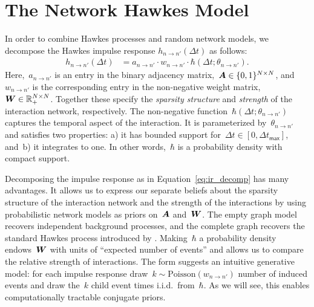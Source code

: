 \section{The Network Hawkes Model}
\label{sec:network_hawkes_model}
In order to combine Hawkes processes and random network models, we
decompose the Hawkes impulse response $h_{n \to n'}(\Delta t)$ as
follows:
\begin{align}
\label{eq:ir_decomp}
h_{n \to n'}(\Delta t) &= a_{n \to n'} \cdot w_{n \to n'} \cdot \hbar(\Delta t; \theta_{n \to n'}).
\end{align}
Here,~$a_{n \to n'}$ is an entry in the binary adjacency
matrix,~${\boldsymbol{A}\in\{0,1\}^{N \times N}}$,
and~$w_{n \to n'}$ is the corresponding entry in the non-negative
weight matrix,~${\boldsymbol{W} \in\mathbb{R}_+^{N\times N}}$. Together these specify
the \emph{sparsity structure} and \emph{strength} of the interaction
network, respectively. The non-negative function~${\hbar(\Delta t;
  \theta_{n \to n'})}$ captures the temporal aspect of the
interaction. It is parameterized by~${\theta_{n \to n'}}$ and
satisfies two properties: a) it has bounded support for~${\Delta t \in
  [0,\Delta t_{\mathsf{max}}]}$, and~b) it integrates to one. In other
words,~$\hbar$ is a probability density with compact support.

Decomposing the impulse response as in Equation~\ref{eq:ir_decomp} has
many advantages. It allows us to express our separate beliefs about
the sparsity structure of the interaction network and the strength of
the interactions by using probabilistic network models as priors
on~$\boldsymbol{A}$ and~$\boldsymbol{W}$.  The empty graph model recovers independent
background processes, and the complete graph recovers the standard
Hawkes process introduced by \citet{Hawkes-1971}.  Making~$\hbar$ a
probability density endows~$\boldsymbol{W}$ with units of ``expected number of
events'' and allows us to compare the relative strength of
interactions. The form suggests an intuitive generative model: for
each impulse response draw~${k \sim \text{Poisson}(w_{n \to n'})}$
number of induced events and draw the~$k$ child event times
i.i.d.\ from~$\hbar$.  
As we will see, this enables computationally
tractable conjugate priors.

